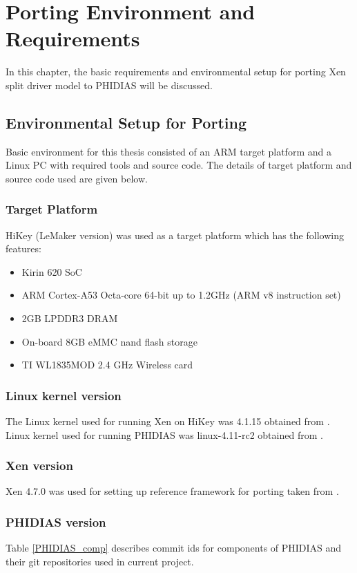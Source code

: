 \chapter{Porting Environment and Requirements\label{cha:chapter4}}
In this chapter, the basic requirements and environmental setup for porting Xen split driver model to PHIDIAS will be discussed. 

\section{Environmental Setup for Porting\label{sec:xen}}
Basic environment for this thesis consisted of an ARM target platform and a Linux PC with required tools and source code. The details of target platform and source code used are given below.

\subsection{Target Platform\label{sec:xen}}
HiKey (LeMaker version) \cite{hikey} was used as a target platform which has the following features:
\begin{itemize}
	\item Kirin 620 SoC
	\item ARM Cortex-A53 Octa-core 64-bit up to 1.2GHz (ARM v8 instruction set)
	\item 2GB LPDDR3 DRAM
	\item On-board 8GB eMMC nand flash storage
	\item TI WL1835MOD 2.4 GHz Wireless card
\end{itemize}

\subsection{Linux kernel version\label{sec:xen}}
The Linux kernel used for running Xen on HiKey was 4.1.15 obtained from \cite{96boards_2016}. Linux kernel used for running PHIDIAS was linux-4.11-rc2 obtained from \cite{linux4_11}. 

\subsection{Xen version\label{sec:xen}}
Xen 4.7.0 was used for setting up reference framework for porting taken from \cite{xengit}.

\subsection{PHIDIAS version\label{sec:xen}}
Table \ref{PHIDIAS_comp} describes commit ids for components of PHIDIAS and their git repositories used in current project.

